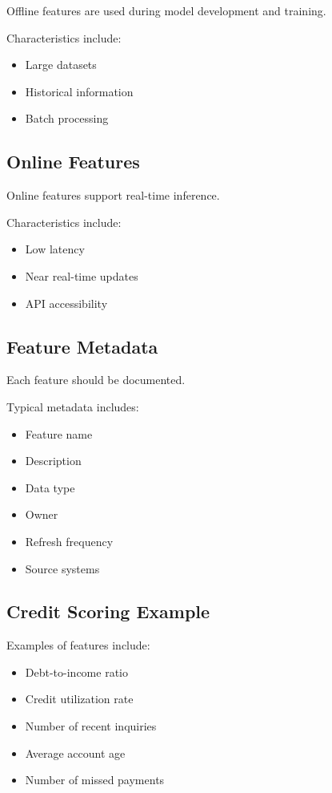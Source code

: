 Offline features are used during model development and training.

Characteristics include:

\begin{itemize}
    \item Large datasets
    \item Historical information
    \item Batch processing
\end{itemize}

\subsection{Online Features}

Online features support real-time inference.

Characteristics include:

\begin{itemize}
    \item Low latency
    \item Near real-time updates
    \item API accessibility
\end{itemize}

\subsection{Feature Metadata}

Each feature should be documented.

Typical metadata includes:

\begin{itemize}
    \item Feature name
    \item Description
    \item Data type
    \item Owner
    \item Refresh frequency
    \item Source systems
\end{itemize}

\subsection{Credit Scoring Example}

Examples of features include:

\begin{itemize}
    \item Debt-to-income ratio
    \item Credit utilization rate
    \item Number of recent inquiries
    \item Average account age
    \item Number of missed payments
\end{itemize}

